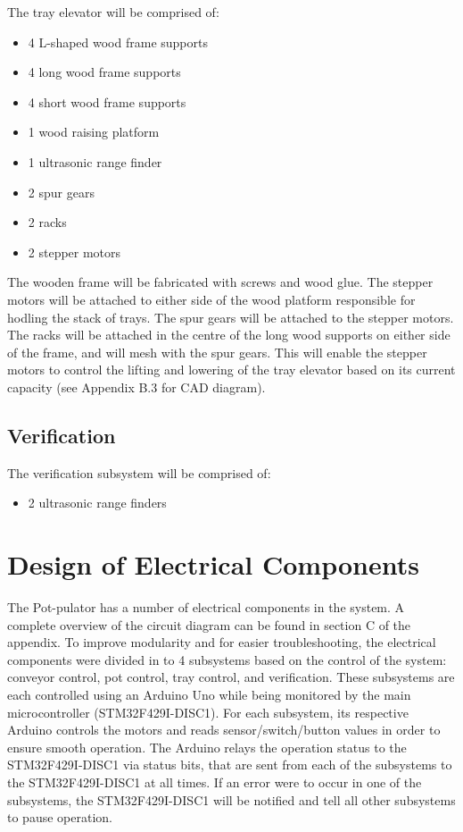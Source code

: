 \documentclass[12pt, titlepage]{article}
\begin{document}
The tray elevator will be comprised of:
\begin{itemize}
  \item 4 L-shaped wood frame supports
  \item 4 long wood frame supports
  \item 4 short wood frame supports
  \item 1 wood raising platform
  \item 1 ultrasonic range finder
  \item 2 spur gears
  \item 2 racks
  \item 2 stepper motors
\end{itemize}
The wooden frame will be fabricated with screws and wood glue. The stepper motors 
will be attached to either side of the wood platform responsible for hodling the 
stack of trays. The spur gears will be attached to the stepper motors. The racks 
will be attached in the centre of the long wood supports on either side of the frame, 
and will mesh with the spur gears. This will enable the stepper motors to control the 
lifting and lowering of the tray elevator based on its current capacity (see Appendix B.3
for CAD diagram).

\subsection{Verification}

The verification subsystem will be comprised of:
\begin{itemize}
  \item 2 ultrasonic range finders
\end{itemize}

\section{Design of Electrical Components}

The Pot-pulator has a number of electrical components in the system. A complete overview of the circuit diagram
can be found in section C of the appendix. To improve modularity and for easier troubleshooting,
the electrical components were divided in to 4 subsystems based on the control of the system: conveyor control, pot
control, tray control, and verification. These subsystems are each controlled using an 
Arduino Uno while being monitored by the main microcontroller (STM32F429I-DISC1). For each subsystem,
its respective Arduino controls the motors and reads sensor/switch/button values in order to ensure smooth operation. 
The Arduino relays the operation status to the STM32F429I-DISC1 via status bits, that are sent from each of the 
subsystems to the STM32F429I-DISC1 at all times. If an error were to occur in
one of the subsystems, the STM32F429I-DISC1 will be notified and tell all other subsystems to pause operation.
\end{document}
